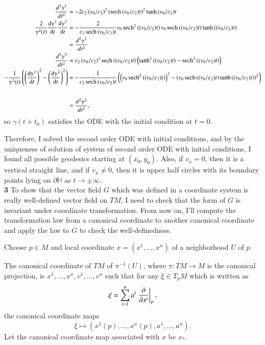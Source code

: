 \documentclass[a4paper, 12pt]{article}
\theoremstyle{Mydefinition}
\theoremstyle{Mytheorem}
\begin{document}
\begin{equation*}
\begin{split}
    \frac{d^2\gamma^1}{dt^2} &= -2c_2\left(v_0/c_2\right)^2 (\sech{(v_0/c_2)t})^2 \tanh{(v_0/c_2)t}\\
    \frac{2}{\gamma^2(t)} \dv{\gamma^1}{t}\dv{\gamma^2}{t} &= -\frac{2}{c_2\sech{(v_0/c_2)t}}v_0\sech^2\left((v_0/c_2)t\right)v_0\sech\left((v_0/c_2)t\right)\tanh\left((v_0/c_2)t\right)\\
    &=\frac{d^2\gamma^1}{dt^2}\\
    \frac{d^2\gamma^2}{dt^2}&=c_2\left(v_0/c_2\right)^2\sech\left((v_0/c_2)t\right)\left( \tanh^2\left((v_0/c_2)t\right)-\sech^2\left((v_0/c_2)t\right)\right)\\
    -\frac{1}{\gamma^2(t)}\left(\left(\dv{\gamma^1}{t}\right)^2-\left(\dv{\gamma^2}{t}\right)^2\right) &= -\frac{1}{c_2\sech{(v_0/c_2)t}}\left(\left(v_0\sech^2\left((v_0/c_2)t\right)\right)^2 - \left(v_0\sech\left((v_0/c_2)t\right)\tanh\left((v_0/c_2)t\right)\right)^2\right)\\\\
    &=\frac{d^2\gamma^2}{dt^2},
\end{split}
\end{equation*}
so $\gamma(t + t_0)$ satisfies the ODE with the initial condition at $t=0$.

Therefore, I solved the second order ODE with initial conditions, and by the uniqueness of solution of system of second order ODE with initial conditions, I found all possible geodesics starting at $(x_0,y_0)$. Also, if $v_x=0$, then it is a vertical straight line, and if $v_x\neq 0$, then it is upper half circles with its boundary points lying on $\partial \mathbb{H}$ as $t\rightarrow \pm \infty$.\\

\noindent \textbf{3}
To show that the vector field $G$ which was defined in a coordinate system is really well-defined vector field on $TM$, I need to check that the form of $G$ is invariant under coordinate transformation. From now on, I'll compute the transformation law from a canonical coordinate to another canonical coordinate and apply the law to $G$ to check the well-definedness.

Choose $p\in M$ and local coordinate $x=(x^1, \ldots, x^n)$ of a neighborhood $U$ of $p$.

The canonical coordinate of $TM$ of $\pi^{-1}(U)$, where $\pi:TM\rightarrow M$ is the canonical projection, is $x^1, \ldots, x^n, v^1, \ldots, v^n$ such that for any $\xi\in T_pM$ which is written as 
\begin{equation*}
    \xi = \sum_{i=1}^n a^i \left.\pdv{x^i}\right|_{p},
\end{equation*}
the canonical coordinate maps
\begin{equation*}
    \xi\mapsto (x^1(p), \ldots, x^n(p), a^1, \ldots, a^n).
\end{equation*}
Let the canonical coordinate map associated with $x$ be $x_*$.
\end{document}
